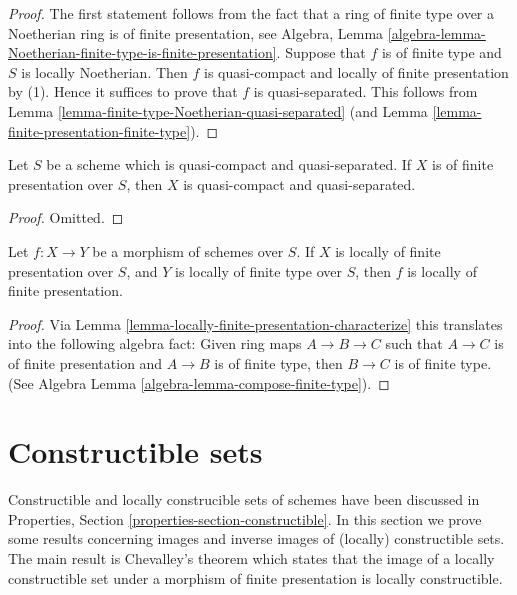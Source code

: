 \begin{proof}
The first statement follows from the fact that a ring
of finite type over a Noetherian ring is of finite presentation, see Algebra,
Lemma \ref{algebra-lemma-Noetherian-finite-type-is-finite-presentation}.
Suppose that $f$ is of finite type and $S$ is locally Noetherian.
Then $f$ is quasi-compact and locally of finite presentation by (1).
Hence it suffices to prove that $f$ is quasi-separated.
This follows from Lemma \ref{lemma-finite-type-Noetherian-quasi-separated}
(and Lemma \ref{lemma-finite-presentation-finite-type}).
\end{proof}

\begin{lemma}
\label{lemma-finite-presentation-quasi-compact-quasi-separated}
Let $S$ be a scheme which is quasi-compact and quasi-separated.
If $X$ is of finite presentation over $S$, then $X$ is quasi-compact
and quasi-separated.
\end{lemma}

\begin{proof}
Omitted.
\end{proof}

\begin{lemma}
\label{lemma-finite-presentation-permanence}
Let $f : X \to Y$ be a morphism of schemes over $S$.
If $X$ is locally of finite presentation over $S$, and
$Y$ is locally of finite type over $S$, then $f$ is locally
of finite presentation.
\end{lemma}

\begin{proof}
Via Lemma \ref{lemma-locally-finite-presentation-characterize} this translates
into the following algebra
fact: Given ring maps $A \to B \to C$ such that $A \to C$ is
of finite presentation and $A \to B$ is of finite type,
then $B \to C$ is of finite type.
(See Algebra Lemma \ref{algebra-lemma-compose-finite-type}).
\end{proof}




\section{Constructible sets}
\label{section-constructible}

\noindent
Constructible and locally construcible sets of schemes have been discussed in
Properties, Section \ref{properties-section-constructible}.
In this section we prove some results concerning images and inverse images
of (locally) constructible sets. The main result is Chevalley's theorem
which states that the image of a locally constructible set under a morphism
of finite presentation is locally constructible.


